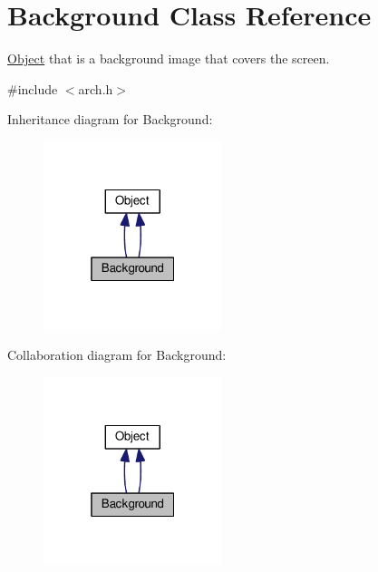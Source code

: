 \hypertarget{classBackground}{}\section{Background Class Reference}
\label{classBackground}


\hyperlink{classObject}{Object} that is a background image that covers the screen.  




{\ttfamily \#include $<$arch.\+h$>$}



Inheritance diagram for Background\+:
\nopagebreak
\begin{figure}[H]
\begin{center}
\leavevmode
\includegraphics[width=148pt]{classBackground__inherit__graph}
\end{center}
\end{figure}


Collaboration diagram for Background\+:
\nopagebreak
\begin{figure}[H]
\begin{center}
\leavevmode
\includegraphics[width=148pt]{classBackground__coll__graph}
\end{center}
\end{figure}

